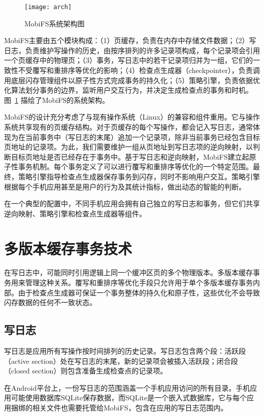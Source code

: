 \begin{figure}
  \centering
  \texttt{[image: arch]}
  \caption{MobiFS系统架构图}
  \label{fig:arch}
\end{figure}

MobiFS主要由五个模块构成：（1）页缓存，负责在内存中存储文件数据；（2）写日志，负责维护写操作的历史，由按序排列的许多记录项构成，每个记录项会引用一个页缓存中的物理页；（3）事务，写日志中的若干记录项归并为一组，它们的一致性不受覆写和重排序等优化的影响；（4）检查点生成器（checkpointer），负责调用底层闪存管理组件以原子性方式完成事务的持久化；（5）策略引擎，负责依据优化算法划分事务的边界，监听用户交互行为，并决定生成检查点的事务和时机。图~\ref{fig:arch} 描绘了MobiFS的系统架构。

MobiFS的设计充分考虑了与现有操作系统（Linux）的兼容和组件重用。它与操作系统共享现有的页缓存结构。对于页缓存的每个写操作，都会记入写日志，通常体现为在当前事务中（写日志的末尾）追加一个记录项，除非当前事务已经包含目标页地址的记录项。为此，我们需要维护一组从页地址到写日志项的逆向映射，以判断目标页地址是否已经存在于事务中。基于写日志和逆向映射，MobiFS建立起原子性事务机制。每个事务定义了可以进行覆写和重排序等优化的一个特定范围。最终，策略引擎指导检查点生成器保存事务到闪存，同时不影响用户交互。策略引擎根据每个手机应用甚至是用户的行为及其统计指标，做出动态的智能的判断。

在一个典型的配置中，不同手机应用会拥有自己独立的写日志和事务，但它们共享逆向映射、策略引擎和检查点生成器等组件。

\section{多版本缓存事务技术}

在写日志中，可能同时引用逻辑上同一个缓冲区页的多个物理版本。多版本缓存事务用来管理这种关系。覆写和重排序等优化手段只允许用于单个多版本缓存事务内部。由于检查点生成器可保证一个事务整体的持久化和原子性，这些优化不会导致闪存数据的任何不一致状态。

\subsection{写日志}

写日志是应用所有写操作按时间排列的历史记录。写日志包含两个段：活跃段（active section）处在写日志的末尾，新的记录项会被插入活跃段；闭合段（closed section）则包含准备生成检查点的记录项。 
 
在Android平台上，一份写日志的范围涵盖一个手机应用访问的所有目录。手机应用可能使用数据库SQLite保存数据，而SQLite是一个嵌入式数据库，它与每个应用捆绑的相关文件也需要托管给MobiFS，包含在应用的写日志范围内。
 
